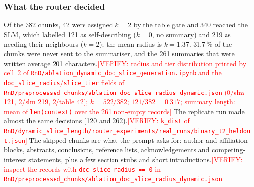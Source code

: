\documentclass[pdflatex,sn-mathphys-num]{sn-jnl}
\newcommand{\todo}[1]{\textcolor{red}{#1}}
\newcommand{\verify}[1]{\todo{[VERIFY: #1]}}
\theoremstyle{thmstyleone}%
\theoremstyle{thmstylethree}%
\begin{document}
\subsubsection{What the router decided}
Of the 382 chunks, 42 were assigned $k=2$ by the table gate and 340 reached the SLM, which labelled 121 as self-describing ($k=0$, no summary) and 219 as needing their neighbours ($k=2$); the mean radius is $\bar k=1.37$, 31.7\,\% of the chunks were never sent to the summariser, and the 261 summaries that were written average 201 characters.\verify{radius and tier distribution printed by cell~2 of \texttt{RnD/ablation\_dynamic\_doc\_slice\_generation.ipynb} and the \texttt{doc\_slice\_radius}/\texttt{slice\_tier} fields of \texttt{RnD/preprocessed\_chunks/ablation\_doc\_slice\_radius\_dynamic.json} (0/slm 121, 2/slm 219, 2/table 42); $\bar k=522/382$; $121/382=0.317$; summary length: mean of \texttt{len(context)} over the 261 non-empty records} The replicate run made almost the same decisions (120 and 262).\verify{\texttt{k\_dist} of \texttt{RnD/dynamic\_slice\_length/router\_experiments/real\_runs/binary\_t2\_heldout.json}} The skipped chunks are what the prompt asks for: author and affiliation blocks, abstracts, conclusions, reference lists, acknowledgements and competing-interest statements, plus a few section stubs and short introductions.\verify{inspect the records with \texttt{doc\_slice\_radius == 0} in \texttt{RnD/preprocessed\_chunks/ablation\_doc\_slice\_radius\_dynamic.json}}
\end{document}
